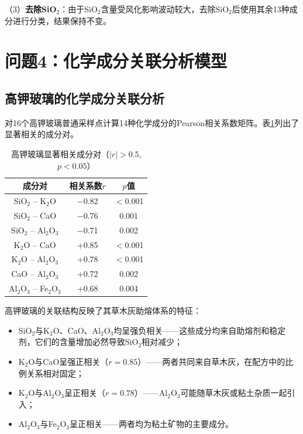 \documentclass[12pt,a4paper]{ctexart}
\begin{document}
（3）\textbf{去除SiO$_2$}：由于SiO$_2$含量受风化影响波动较大，去除SiO$_2$后使用其余13种成分进行分类，结果保持不变。

\section{问题4：化学成分关联分析模型}

\subsection{高钾玻璃的化学成分关联分析}

对16个高钾玻璃普通采样点计算14种化学成分的Pearson相关系数矩阵。表\ref{tab:hk_corr}列出了显著相关的成分对。

\begin{table}[H]
\centering
\caption{高钾玻璃显著相关成分对（$|r|>0.5$, $p<0.05$）}
\label{tab:hk_corr}
\begin{tabular}{ccc}
\toprule
\textbf{成分对} & \textbf{相关系数$r$} & \textbf{$p$值} \\
\midrule
SiO$_2$ -- K$_2$O  & $-$0.82 & $<$0.001 \\
SiO$_2$ -- CaO     & $-$0.76 & 0.001  \\
SiO$_2$ -- Al$_2$O$_3$ & $-$0.71 & 0.002 \\
K$_2$O -- CaO      & +0.85  & $<$0.001 \\
K$_2$O -- Al$_2$O$_3$ & +0.78  & $<$0.001 \\
CaO -- Al$_2$O$_3$ & +0.72  & 0.002  \\
Al$_2$O$_3$ -- Fe$_2$O$_3$ & +0.68 & 0.004 \\
\bottomrule
\end{tabular}
\end{table}

高钾玻璃的关联结构反映了其草木灰助熔体系的特征：
\begin{itemize}
    \item SiO$_2$与K$_2$O、CaO、Al$_2$O$_3$均呈强负相关——这些成分均来自助熔剂和稳定剂，它们的含量增加必然导致SiO$_2$相对减少；
    \item K$_2$O与CaO呈强正相关（$r=0.85$）——两者共同来自草木灰，在配方中的比例关系相对固定；
    \item K$_2$O与Al$_2$O$_3$呈正相关（$r=0.78$）——Al$_2$O$_3$可能随草木灰或粘土杂质一起引入；
    \item Al$_2$O$_3$与Fe$_2$O$_3$呈正相关——两者均为粘土矿物的主要成分。
\end{itemize}
\end{document}
